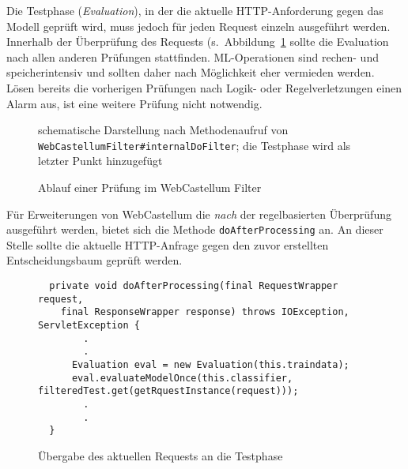 Die Testphase (\emph{Evaluation}), in der die aktuelle HTTP-Anforderung gegen das Modell geprüft wird, muss jedoch für jeden Request einzeln ausgeführt werden. Innerhalb der Überprüfung des Requests (s.~Abbildung~\ref{fig:wcfilter} sollte die Evaluation nach allen anderen Prüfungen stattfinden. ML-Operationen sind rechen- und speicherintensiv und sollten daher nach Möglichkeit eher vermieden werden. Lösen bereits die vorherigen Prüfungen nach Logik- oder Regelverletzungen einen Alarm aus, ist eine weitere Prüfung nicht notwendig.

\begin{figure}[h]
  \centering
  
  \caption{Ablauf einer Prüfung im WebCastellum Filter}
  \label{fig:wcfilter}
  \medskip
  \small
  schematische Darstellung nach Methodenaufruf von \verb=WebCastellumFilter#internalDoFilter=; die Testphase wird als letzter Punkt hinzugefügt
\end{figure}

Für Erweiterungen von WebCastellum die \emph{nach} der regelbasierten Überprüfung ausgeführt werden, bietet sich die Methode \verb=doAfterProcessing= an. An dieser Stelle sollte die aktuelle HTTP-Anfrage gegen den zuvor erstellten Entscheidungsbaum geprüft werden.\\

\begin{figure}[h]
  \centering
  \begin{lstlisting}
  private void doAfterProcessing(final RequestWrapper request,
    final ResponseWrapper response) throws IOException, ServletException {
        .
        .
      Evaluation eval = new Evaluation(this.traindata);
      eval.evaluateModelOnce(this.classifier, filteredTest.get(getRquestInstance(request)));
        .
        .
  }
\end{lstlisting}
\caption{Übergabe des aktuellen Requests an die Testphase}
\label{fig:wekatest}

\end{figure}

